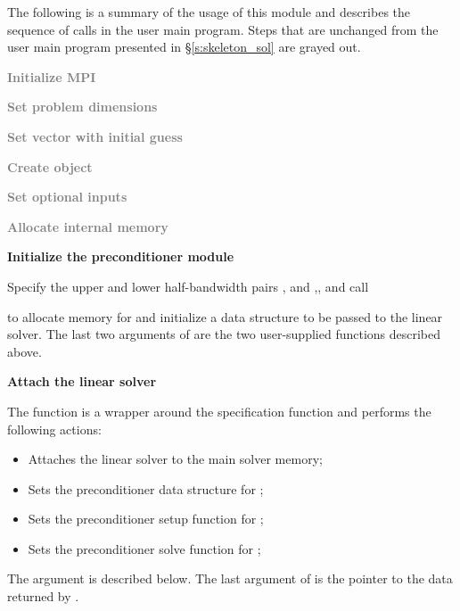 The following is a summary of the usage of this module and describes the sequence
of calls in the user main program. Steps that are unchanged from the user main
program presented in \S\ref{s:skeleton_sol} are grayed out.
\begin{Steps}
\item 
  \textcolor{gray}{\bf Initialize MPI}

\item
  \textcolor{gray}{\bf Set problem dimensions}

\item
  \textcolor{gray}{\bf Set vector with initial guess}
 
\item
  \textcolor{gray}{\bf Create {\kinsol} object}

\item
  \textcolor{gray}{\bf Set optional inputs}

\item
  \textcolor{gray}{\bf Allocate internal memory}

\item \label{i:bbdpre_init}
  {\bf Initialize the {\kinbbdpre} preconditioner module}

  Specify the upper and lower half-bandwidth pairs , and
  ,, and call


  to allocate memory for and initialize a data structure  to be 
  passed to the {\kinspgmr} linear solver. The last two arguments of
   are the two user-supplied functions described above.

\item \label{i:bbdpre_attach}
  {\bf Attach the {\kinspgmr} linear solver}


  The function  is a wrapper around the {\kinspgmr} specification
  function  and performs the following actions:
  \begin{itemize}
    \item Attaches the {\kinspgmr} linear solver to the main {\cvode} solver memory;
    \item Sets the preconditioner data structure for {\kinbbdpre};
    \item Sets the preconditioner setup function for {\kinbbdpre};
    \item Sets the preconditioner solve function for {\kinbbdpre};
  \end{itemize}
  The argument  is described below.
  The last argument of  is the pointer to the {\kinbbdpre} data
  returned by .


\end{Steps}
